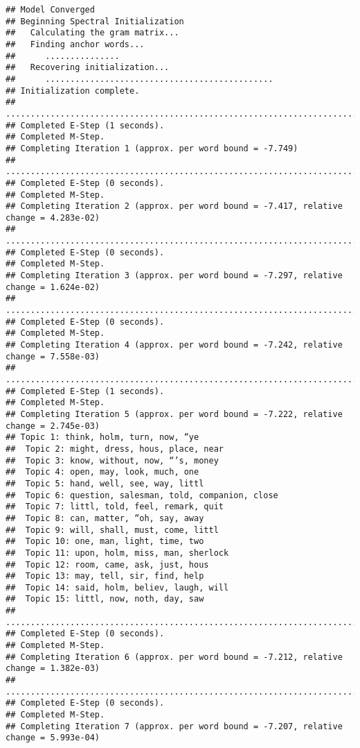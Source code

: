 \documentclass[
]{book}
\begin{document}
\begin{verbatim}
## Model Converged 
## Beginning Spectral Initialization 
##   Calculating the gram matrix...
##   Finding anchor words...
##      ...............
##   Recovering initialization...
##      ..............................................
## Initialization complete.
## ....................................................................................................
## Completed E-Step (1 seconds). 
## Completed M-Step. 
## Completing Iteration 1 (approx. per word bound = -7.749) 
## ....................................................................................................
## Completed E-Step (0 seconds). 
## Completed M-Step. 
## Completing Iteration 2 (approx. per word bound = -7.417, relative change = 4.283e-02) 
## ....................................................................................................
## Completed E-Step (0 seconds). 
## Completed M-Step. 
## Completing Iteration 3 (approx. per word bound = -7.297, relative change = 1.624e-02) 
## ....................................................................................................
## Completed E-Step (0 seconds). 
## Completed M-Step. 
## Completing Iteration 4 (approx. per word bound = -7.242, relative change = 7.558e-03) 
## ....................................................................................................
## Completed E-Step (1 seconds). 
## Completed M-Step. 
## Completing Iteration 5 (approx. per word bound = -7.222, relative change = 2.745e-03) 
## Topic 1: think, holm, turn, now, “ye 
##  Topic 2: might, dress, hous, place, near 
##  Topic 3: know, without, now, “’s, money 
##  Topic 4: open, may, look, much, one 
##  Topic 5: hand, well, see, way, littl 
##  Topic 6: question, salesman, told, companion, close 
##  Topic 7: littl, told, feel, remark, quit 
##  Topic 8: can, matter, “oh, say, away 
##  Topic 9: will, shall, must, come, littl 
##  Topic 10: one, man, light, time, two 
##  Topic 11: upon, holm, miss, man, sherlock 
##  Topic 12: room, came, ask, just, hous 
##  Topic 13: may, tell, sir, find, help 
##  Topic 14: said, holm, believ, laugh, will 
##  Topic 15: littl, now, noth, day, saw 
## ....................................................................................................
## Completed E-Step (0 seconds). 
## Completed M-Step. 
## Completing Iteration 6 (approx. per word bound = -7.212, relative change = 1.382e-03) 
## ....................................................................................................
## Completed E-Step (0 seconds). 
## Completed M-Step. 
## Completing Iteration 7 (approx. per word bound = -7.207, relative change = 5.993e-04) 

\end{verbatim}
\end{document}
